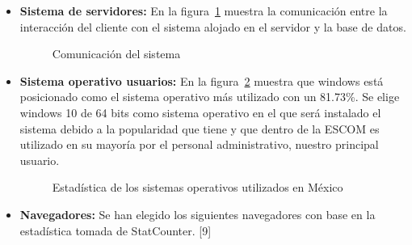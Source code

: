 		\begin{itemize}
			\item \textbf{Sistema de servidores:} En la figura~\ref{fig:servidor} muestra la comunicación entre la interacción del cliente con el sistema alojado en el servidor y la base de datos.
			
			\begin{figure}[htbp!]
				\begin{center}
					\caption{Comunicación del sistema}
					\label{fig:servidor}
				\end{center}
			\end{figure}
			
			
			
			\item \textbf{Sistema operativo usuarios:} En la figura~\ref{fig:so} muestra que windows está posicionado como el sistema operativo más utilizado con un 81.73\%. Se elige windows 10 de 64 bits como sistema operativo en el que será instalado el sistema debido a la popularidad que tiene y que dentro de la ESCOM es utilizado en su mayoría por el personal administrativo, nuestro principal usuario.
			
			\begin{figure}[htbp!]
				\begin{center}
					\caption{Estadística de los sistemas operativos utilizados en México}
					\label{fig:so}
				\end{center}
			\end{figure}
		
			\item \textbf{Navegadores:} Se han elegido los siguientes navegadores con base en la estadística tomada de StatCounter. [9] 
			

\end{itemize}

